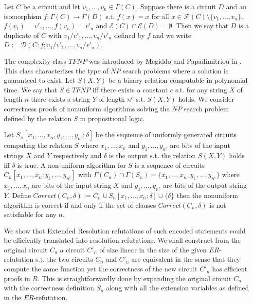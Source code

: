 \documentclass{LMCS}
\theoremstyle{plain}\newtheorem{satz}[thm]{Satz}
\begin{document}
\begin{defi}
Let $C$ be a circuit and let $v_1,...,v_n \in \Gamma(C)$. Suppose there is a circuit $D$ and an isomorphism $f: \Gamma(C) \longrightarrow \Gamma(D)$ s.t. $f(x)=x$ for all $x \in {\mathcal F}(C) \setminus \{ v_1,..., v_n \}$,  $f(v_1)=v'_1,...,f(v_n)=v'_n$ and ${\mathcal E}(C) \cap {\mathcal E}(D) = \emptyset$. Then we say that $D$ is a duplicate of $C$ with $v_1/v'_1,...,v_n/v'_n$ defined by $f$ and we write $D := {\mathcal D}(C;f; v_1/v'_1,...,v_n/v'_n)$.
\end{defi}

The complexity class $TFNP$ was introduced by Megiddo and Papadimitriou in \cite{MR1107721}. This class characterizes the type of $NP$ search problems where a solution is guaranteed to exist. Let $S(X,Y)$ be a binary relation computable in polynomial time. We say that $S \in TFNP$ iff there exists a constant $c$ s.t. for any string $X$ of length $n$ there exists a string $Y$ of length $n^c$ s.t. $S(X,Y)$ holds. We consider correctness proofs of nonuniform algorithms solving the $NP$ search problem defined by the relation $S$ in propositional logic.

Let $S_n[x_1,...,x_n,y_1,...,y_{n^c};\delta]$ be the sequence of uniformly generated circuits computing the relation $S$ where $x_1,...,x_n$ and $y_1,...,y_{n^c}$ are bits of the input strings $X$ and $Y$ respectively and $\delta$ is the output s.t. the relation $S(X,Y)$ holds iff $\delta$ is true. A non-uniform algorithm for $S$ is a sequence of circuits $C_n[x_1,...,x_n;y_1,...,y_{n^c}]$ with $\Gamma(C_n) \cap \Gamma(S_n) = \{x_1,...,x_n,y_1,...,y_{n^c}\}$ where $x_1,...,x_n$ are bits of the input string $X$ and $y_1,...,y_{n^c}$ are bits of the output string $Y$. Define $Correct(C_n,\delta):=C_n \cup S_n [x_1,...,x_n;\delta] \cup \{\overline{\delta}\}$ then the nonuniform algorithm is correct if and only if the set of clauses $Correct(C_n,\delta)$ is not satisfiable for any $n$.

We show that Extended Resolution refutations of such encoded statements could be efficiently translated into resolution refutations. We shall construct from the original circuit $C_n$ a circuit $C'_n$ of size linear in the size of the given $ER$-refutation s.t. the two circuits $C_n$ and $C'_n$ are equivalent in the sense that they compute the same function yet the correctness of the new circuit $C'_n$ has efficient proofs in $R$. This is straightforwardly done by expanding the original circuit $C_n$ with the correctness definition $S_n$ along with all the extension variables as defined in the $ER$-refutation.
\end{document}
